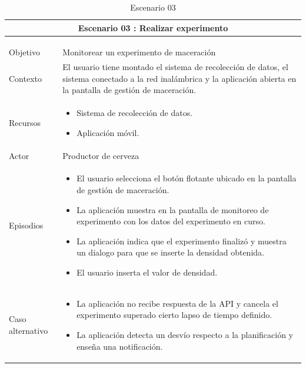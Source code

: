 \begin{longtable}{|p{2cm}|p{12cm}|}
    \hline
    \multicolumn{2}{|c|}{ Escenario 03 : Realizar experimento} \\
    \hline
    \hline
    \endfirsthead
    
    \hline
    \caption{Escenario 03}\\
    \endfoot
    
    \hline
    \multicolumn{2}{|c|}{Continuación de la Tabla \ref{tab:TablaEscenario03}}\\
    \hline
    \hline
    \endhead
    
    \hline
    \caption{Escenario 03 \label{tab:TablaEscenario03}}\\
    \endlastfoot


    Objetivo
    & Monitorear un experimento de maceración \\
    \hline
    
    Contexto
    & El usuario tiene montado el sistema de recolección de datos, el sistema conectado a la red inalámbrica y la aplicación abierta en la pantalla de gestión de maceración.
    \\
    \hline
    
    Recursos
    &
    \begin{itemize}
        \item Sistema de recolección de datos.
        \item Aplicación móvil.
    \end{itemize} 
    \\
    \hline
    
    Actor
    & Productor de cerveza
    \\
    \hline
    
    Episodios
    & \begin{itemize}
        \item El usuario selecciona el botón flotante ubicado en la pantalla de gestión de maceración.
        \item La aplicación muestra en la pantalla de monitoreo de experimento con los datos del experimento en curso.
        \item La aplicación indica que el experimento finalizó y muestra un dialogo para que se inserte la densidad obtenida.
        \item El usuario inserta el valor de densidad.
    \end{itemize}
    \\
    \hline
    
    Caso alternativo
    & \begin{itemize}
        \item La aplicación no recibe respuesta de la API y cancela el experimento superado cierto lapso de tiempo definido.
        \item La aplicación detecta un desvío respecto a la planificación y enseña una notificación.
    \end{itemize}
    \\
    \hline
\end{longtable}

